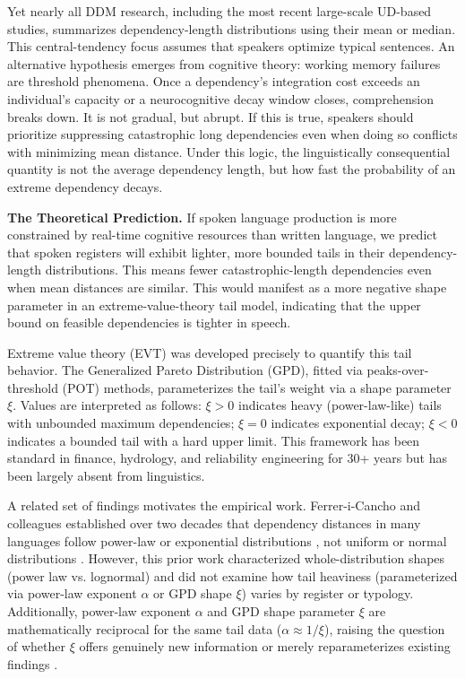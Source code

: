 \documentclass[11pt,letterpaper]{article}
\begin{document}
Yet nearly all DDM research, including the most recent large-scale UD-based studies, summarizes dependency-length distributions using their mean or median. This central-tendency focus assumes that speakers optimize typical sentences. An alternative hypothesis emerges from cognitive theory: working memory failures are threshold phenomena. Once a dependency's integration cost exceeds an individual's capacity or a neurocognitive decay window closes, comprehension breaks down. It is not gradual, but abrupt. If this is true, speakers should prioritize suppressing catastrophic long dependencies even when doing so conflicts with minimizing mean distance. Under this logic, the linguistically consequential quantity is not the average dependency length, but how fast the probability of an extreme dependency decays.

\textbf{The Theoretical Prediction.} If spoken language production is more constrained by real-time cognitive resources than written language, we predict that spoken registers will exhibit lighter, more bounded tails in their dependency-length distributions. This means fewer catastrophic-length dependencies even when mean distances are similar. This would manifest as a more negative shape parameter in an extreme-value-theory tail model, indicating that the upper bound on feasible dependencies is tighter in speech.

Extreme value theory (EVT) was developed precisely to quantify this tail behavior. The Generalized Pareto Distribution (GPD), fitted via peaks-over-threshold (POT) methods, parameterizes the tail's weight via a shape parameter $\xi$. Values are interpreted as follows: $\xi>0$ indicates heavy (power-law-like) tails with unbounded maximum dependencies; $\xi=0$ indicates exponential decay; $\xi<0$ indicates a bounded tail with a hard upper limit. This framework has been standard in finance, hydrology, and reliability engineering for 30+ years but has been largely absent from linguistics.

A related set of findings motivates the empirical work. Ferrer-i-Cancho and colleagues established over two decades that dependency distances in many languages follow power-law or exponential distributions \citep{Petrini2025}, not uniform or normal distributions \citep{FerreriCancho2004}. However, this prior work characterized whole-distribution shapes (power law vs. lognormal) and did not examine how tail heaviness (parameterized via power-law exponent $\alpha$ or GPD shape $\xi$) varies by register or typology. Additionally, power-law exponent $\alpha$ and GPD shape parameter $\xi$ are mathematically reciprocal for the same tail data ($\alpha \approx 1/\xi$), raising the question of whether $\xi$ offers genuinely new information or merely reparameterizes existing findings \citep{Clauset2009}.
\end{document}
